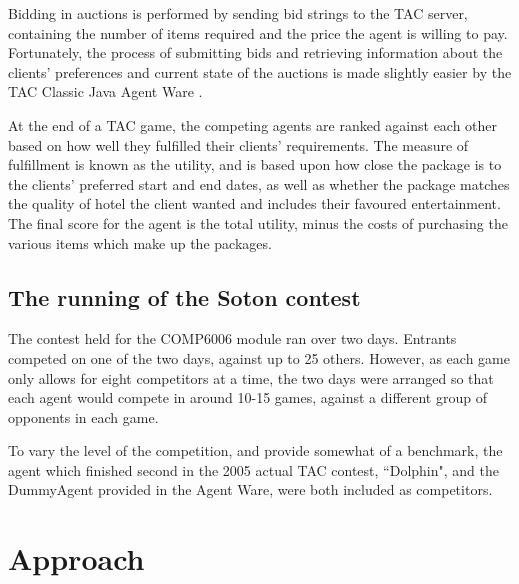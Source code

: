 \documentclass{acm_proc_article-sp}
\begin{document}
 Bidding in auctions is performed by sending bid strings to the TAC server, containing the number of items required and the price the agent is willing to pay.  Fortunately, the process of submitting bids and retrieving information about the clients' preferences and current state of the auctions is made slightly easier by the TAC Classic Java Agent Ware \cite{SICE2007c}.
 
 At the end of a TAC game, the competing agents are ranked against each other based on how well they fulfilled their clients' requirements.  The measure of fulfillment is known as the utility, and is based upon how close the package is to the clients' preferred start and end dates, as well as whether the package matches the quality of hotel the client wanted and includes their favoured entertainment.  The final score for the agent is the total utility, minus the costs of purchasing the various items which make up the packages.
 
 \subsection{The running of the Soton contest}
 
 The contest held for the COMP6006 module ran over two days.  Entrants competed on one of the two days, against up to 25 others.  However, as each game only allows for eight competitors at a time, the two days were arranged so that each agent would compete in around 10-15 games, against a different group of opponents in each game.
 
 To vary the level of the competition, and provide somewhat of a benchmark, the agent which finished second in the 2005 actual TAC contest, ``Dolphin", and the DummyAgent provided in the Agent Ware, were both included as competitors.
 
\section{Approach}
\end{document}
